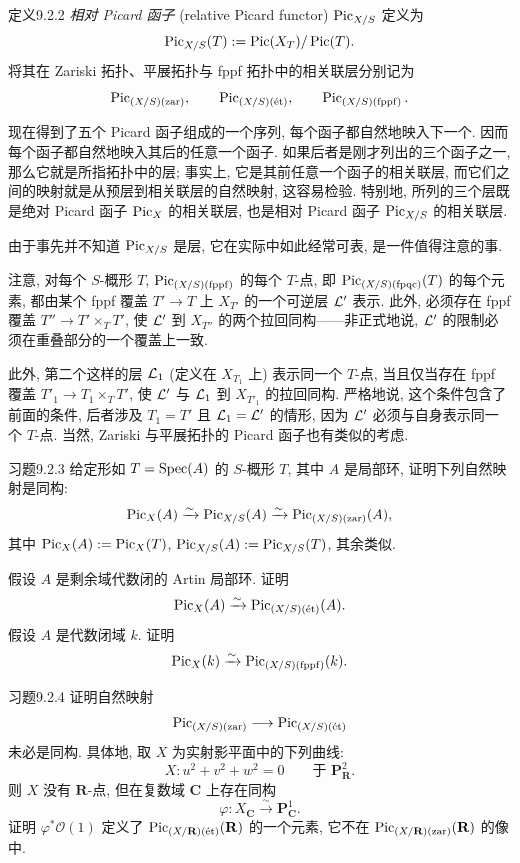 \begin{origstatement}{定义}{9.2.2}\label{ch09s02:def922}
\emph{相对 Picard 函子} (relative Picard functor) $\Pic_{X/S}$ 定义为
\[
\Pic_{X/S}(T):=\Pic(X_T)/\Pic(T).
\]
将其在 Zariski 拓扑、平展拓扑与 fppf 拓扑中的相关联层分别记为
\[
\PZ,\qquad\PE,\qquad\PF.
\]
\end{origstatement}

现在得到了五个 Picard 函子组成的一个序列, 每个函子都自然地映入下一个. 因而每个函子都自然地映入其后的任意一个函子. 如果后者是刚才列出的三个函子之一, 那么它就是所指拓扑中的层; 事实上, 它是其前任意一个函子的相关联层, 而它们之间的映射就是从预层到相关联层的自然映射, 这容易检验. 特别地, 所列的三个层既是绝对 Picard 函子 $\Pic_X$ 的相关联层, 也是相对 Picard 函子 $\Pic_{X/S}$ 的相关联层.

由于事先并不知道 $\Pic_{X/S}$ 是层, 它在实际中如此经常可表, 是一件值得注意的事.

注意, 对每个 $S$-概形 $T$, $\PF$ 的每个 $T$-点, 即 $\PQ(T)$ 的每个元素, 都由某个 fppf 覆盖 $T'\to T$ 上 $X_{T'}$ 的一个可逆层 $\L'$ 表示. 此外, 必须存在 fppf 覆盖 $T''\to T'\times_TT'$, 使 $\L'$ 到 $X_{T''}$ 的两个拉回同构——非正式地说, $\L'$ 的限制必须在重叠部分的一个覆盖上一致.

此外, 第二个这样的层 $\L_1$ (定义在 $X_{T_1}$ 上) 表示同一个 $T$-点, 当且仅当存在 fppf 覆盖 $T'_1\to T_1\times_TT'$, 使 $\L'$ 与 $\L_1$ 到 $X_{T'_1}$ 的拉回同构. 严格地说, 这个条件包含了前面的条件, 后者涉及 $T_1=T'$ 且 $\L_1=\L'$ 的情形, 因为 $\L'$ 必须与自身表示同一个 $T$-点. 当然, Zariski 与平展拓扑的 Picard 函子也有类似的考虑.

\begin{origstatement}{习题}{9.2.3}\label{ch09s02:ex923}
给定形如 $T=\Spec(A)$ 的 $S$-概形 $T$, 其中 $A$ 是局部环, 证明下列自然映射是同构:
\[
\Pic_X(A)\xrightarrow{\sim}\Pic_{X/S}(A)\xrightarrow{\sim}\PZ(A),
\]
其中 $\Pic_X(A):=\Pic_X(T)$, $\Pic_{X/S}(A):=\Pic_{X/S}(T)$, 其余类似.

假设 $A$ 是剩余域代数闭的 Artin 局部环. 证明
\[
\Pic_X(A)\xrightarrow{\sim}\PE(A).
\]
假设 $A$ 是代数闭域 $k$. 证明
\[
\Pic_X(k)\xrightarrow{\sim}\PF(k).
\]
\end{origstatement}

\begin{origstatement}{习题}{9.2.4}\label{ch09s02:ex924}
证明自然映射
\[
\PZ\longrightarrow\PE
\]
未必是同构. 具体地, 取 $X$ 为实射影平面中的下列曲线:
\[
X:u^2+v^2+w^2=0\qquad\text{于 }\mathbf P_{\mathbf R}^2.
\]
则 $X$ 没有 $\mathbf R$-点, 但在复数域 $\mathbf C$ 上存在同构
\[
\varphi:X_{\mathbf C}\xrightarrow{\sim}\mathbf P_{\mathbf C}^1.
\]
证明 $\varphi^*\mathcal O(1)$ 定义了 $\Pic_{(X/\mathbf R)(\text{ét})}(\mathbf R)$ 的一个元素, 它不在 $\Pic_{(X/\mathbf R)(\mathrm{zar})}(\mathbf R)$ 的像中.
\end{origstatement}

